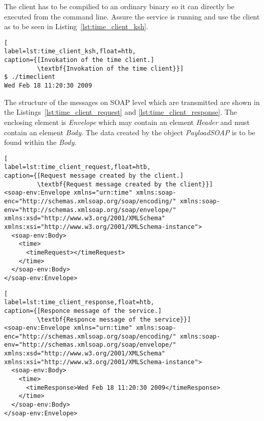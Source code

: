 The client has to be compilied to an ordinary binary so it can directly be executed from the command line.
Assure the service is running and use the client as to be seen in Listing~\ref{lst:time_client_ksh}.
\begin{lstlisting}[
label=lst:time_client_ksh,float=htb,
caption={[Invokation of the time client.]
         \textbf{Invokation of the time client}}]
$ ./timeclient
Wed Feb 18 11:20:30 2009
\end{lstlisting}
The structure of the messages on SOAP level which are transmitted are shown in the Listings~\ref{lst:time_client_request} and \ref{lst:time_client_response}.
The enclosing element is \textit{Envelope} which may contain an element \textit{Header} and must contain an element \textit{Body}. %
The data created by the object \textit{PayloadSOAP} is to be found within the \textit{Body}.
\begin{lstlisting}[
label=lst:time_client_request,float=htb,
caption={[Request message created by the client.]
         \textbf{Request message created by the client}}]
<soap-env:Envelope xmlns="urn:time" xmlns:soap-enc="http://schemas.xmlsoap.org/soap/encoding/" xmlns:soap-env="http://schemas.xmlsoap.org/soap/envelope/" xmlns:xsd="http://www.w3.org/2001/XMLSchema" xmlns:xsi="http://www.w3.org/2001/XMLSchema-instance">
  <soap-env:Body>
    <time>
      <timeRequest></timeRequest>
    </time>
  </soap-env:Body>
</soap-env:Envelope>
\end{lstlisting}


\begin{lstlisting}[
label=lst:time_client_response,float=htb,
caption={[Responce message of the service.]
         \textbf{Responce message of the service}}]
<soap-env:Envelope xmlns="urn:time" xmlns:soap-enc="http://schemas.xmlsoap.org/soap/encoding/" xmlns:soap-env="http://schemas.xmlsoap.org/soap/envelope/" xmlns:xsd="http://www.w3.org/2001/XMLSchema" xmlns:xsi="http://www.w3.org/2001/XMLSchema-instance">
  <soap-env:Body>
    <time>
      <timeResponse>Wed Feb 18 11:20:30 2009</timeResponse>
    </time>
  </soap-env:Body>
</soap-env:Envelope>
\end{lstlisting}


















